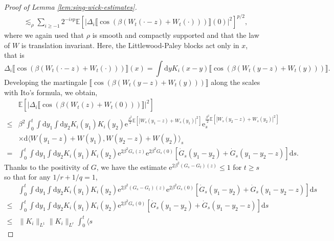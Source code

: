 \documentclass[11pt, a4paper]{scrartcl}
\numberwithin{equation}{section}
\theoremstyle{plain}
\theoremstyle{remark}
\newcommand{\mathd}{\mathrm{d}}
\newcommand{\mathe}{\mathrm{e}}
\begin{document}
\begin{proof}[Proof of Lemma \ref{lem:sing-wick-estimates}]
\[\begin{aligned}
			 & \lesssim_{\rho}  \sum_{i \geqslant - 1} 2^{- isp} \mathbb{E} [|
				\Delta_i \llbracket \cos (\beta (W_t (\cdot - z) + W_t (\cdot)))
				\rrbracket (0) |^2]^{p / 2},
		\end{aligned} \]
	where we again used that $\rho$ is smooth and compactly supported and that
	the law of $W$ is translation invariant. Here, the Littlewood-Paley blocks
	act only in $x$, that is
	\[ \Delta_i \llbracket \cos (\beta (W_t (\cdot - z) + W_t (\cdot)))
		\rrbracket (x) = \int \mathd y K_i (x - y) \llbracket \cos (\beta (W_t (y
		- z) + W_t (y))) \rrbracket . \]
	Developing the martingale $\llbracket \cos (\beta (W_t (y - z) + W_t (y)))
		\rrbracket$ along the scales with Ito's formula, we obtain,
	\[ \begin{aligned}
			          & \mathbb{E} [| \Delta_i \llbracket \cos (\beta (W_t (z) + W_t (0)))
			\rrbracket |^2]                                                                \\
			\leqslant & \beta^2 \int_0^t \int \mathd y_1 \int \mathd y_2 K_i (y_1)
			K_i (y_2) \mathe^{\frac{\beta^2}{2} \mathbb{E} [| W_s (y_1 - z) + W_s
					(y_1) |^2]} \mathe^{\frac{\beta^2}{2} \mathbb{E} [| W_s (y_2 - z) + W_s
			(y_2) |^2]}_s                                                                  \\
			          & \times \mathd \langle W (y_1 - z) + W (y_1), W (y_2 - z) + W (y_2)
			\rangle_s                                                                      \\
			=         & \int_0^t \int \mathd y_1 \int \mathd y_2 K_i (y_1) K_i (y_2)
			\mathe^{2 \beta^2 G_s (z)} \mathe^{2 \beta^2 G_s (0)} [\dot{G}_s (y_1 -
				y_2) + \dot{G}_s (y_1 - y_2 - z)] \mathd s.
		\end{aligned} \]
	Thanks to the positivity of $G$, we have the estimate $\mathe^{2 \beta^2
			(G_s - G_t) (z)} \leqslant 1$ for $t \geqslant s$ so that for any $1 / r + 1
		/ q = 1$,
	{\footnotesize\[ \begin{aligned}
					          & \int_0^t \int \mathd y_1 \int \mathd y_2 K_i (y_1) K_i (y_2)
					\mathe^{2 \beta^2 (G_s - G_t) (z)} \mathe^{2 \beta^2 G_s (0)}
					[\dot{G}_s (y_1 - y_2) + \dot{G}_s (y_1 - y_2 - z)] \mathd s             \\
					\leqslant & \int_0^t \int \mathd y_1 \int \mathd y_2 K_i (y_1) K_i
					(y_2) \mathe^{2 \beta^2 G_s (0)} [\dot{G}_s (y_1 - y_2) + \dot{G}_s
					(y_1 - y_2 - z)] \mathd s                                                \\
					\leqslant & \| K_i \|_{L^1}  \| K_i \|_{L^r} \int_0^t \langle s

\end{aligned}\]}
\end{proof}
\end{document}
